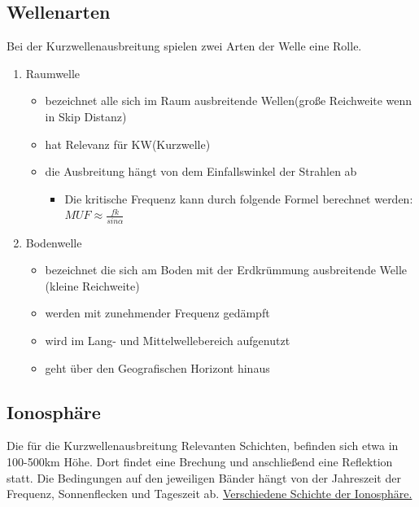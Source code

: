     \subsection[]{Wellenarten}
        Bei der Kurzwellenausbreitung spielen zwei Arten der Welle eine Rolle.
        \begin{enumerate}
            \item Raumwelle
            \begin{itemize}
                \item bezeichnet alle sich im Raum ausbreitende Wellen(große Reichweite wenn in Skip Distanz)
                \item hat Relevanz für KW(Kurzwelle)
                \item die Ausbreitung hängt von dem Einfallswinkel der Strahlen ab
                \begin{itemize}
                    \item Die kritische Frequenz kann durch folgende Formel berechnet werden:\newline \( MUF \approx \frac{f k}{sin \alpha }\)	 
                \end{itemize}
            \end{itemize}
            \item Bodenwelle
            \begin{itemize}
                \item bezeichnet die sich am Boden mit der Erdkrümmung ausbreitende Welle (kleine Reichweite)
                \item werden mit zunehmender Frequenz gedämpft
                \item wird im Lang- und Mittelwellebereich aufgenutzt
                \item geht über den Geografischen Horizont hinaus
            \end{itemize}
        \end{enumerate}
    \subsection[]{Ionosphäre}
        Die für die Kurzwellenausbreitung Relevanten Schichten, befinden sich etwa in 100-500km Höhe.
        Dort findet eine Brechung und anschließend eine Reflektion statt.
        Die Bedingungen auf den jeweiligen Bänder hängt von der Jahreszeit der Frequenz, Sonnenflecken und Tageszeit ab. \newline
        \href{https://www.darc.de/fileadmin/filemounts/referate/ajw/Onlinelehrgang/e09/Bild9-2.gif}{Verschiedene Schichte der Ionosphäre.}

